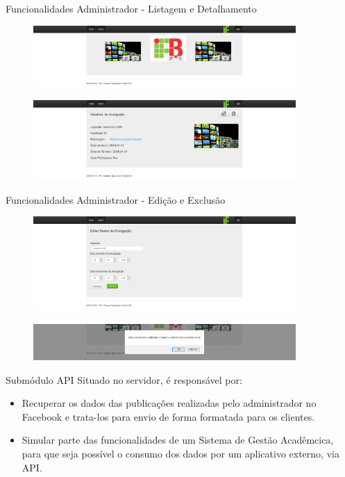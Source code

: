 \documentclass{aula-ifb}
\begin{document}
\begin{frame}{Funcionalidades Administrador - Listagem e Detalhamento}
\begin{figure}[h]
\includegraphics[width=10cm]{figuras/funcionalidadelistar.png}
\label{fig:facebookgraph}
\end{figure}
\begin{figure}[h]
\includegraphics[width=10cm]{figuras/funcionalidadedetalhar.png}
\label{fig:facebookgraph}
\end{figure}
\end{frame}

\begin{frame}{Funcionalidades Administrador - Edição e Exclusão}
\begin{figure}[h]
\includegraphics[width=10cm]{figuras/funcionalidadeeditar.png}
\label{fig:facebookgraph}
\end{figure}

\begin{figure}[h]
\includegraphics[width=10cm]{figuras/funcionalidadedeletar.png}
\label{fig:facebookgraph}
\end{figure}
\end{frame}


\begin{frame}{Submódulo API}
Situado no servidor, é responsável por:
\begin{itemize}
   \item Recuperar os dados das publicações realizadas pelo administrador no Facebook e trata-los para envio de forma formatada para os clientes. 
   \item Simular parte das funcionalidades de um Sistema de Gestão Acadêmcica, para que seja possível o consumo dos dados por um aplicativo externo, via API.
\end{itemize}
\end{frame}
\end{document}
